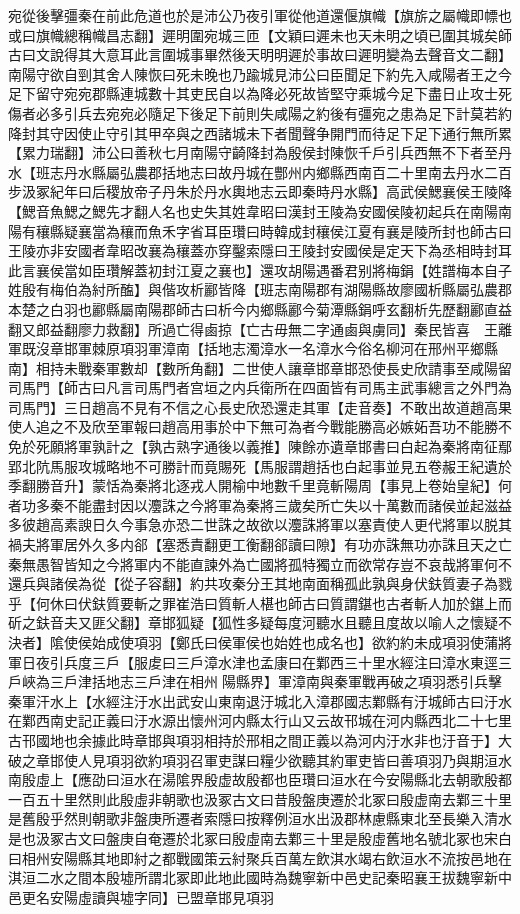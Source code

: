 宛從後擊彊秦在前此危道也於是沛公乃夜引軍從他道還偃旗幟【旗旂之屬幟即幖也或曰旗幟總稱幟昌志翻】遲明圍宛城三匝【文穎曰遲未也天未明之頃已圍其城矣師古曰文說得其大意耳此言圍城事畢然後天明明遲於事故曰遲明變為去聲音文二翻】南陽守欲自剄其舍人陳恢曰死未晚也乃踰城見沛公曰臣聞足下約先入咸陽者王之今足下留守宛宛郡縣連城數十其吏民自以為降必死故皆堅守乘城今足下盡日止攻士死傷者必多引兵去宛宛必隨足下後足下前則失咸陽之約後有彊宛之患為足下計莫若約降封其守因使止守引其甲卒與之西諸城未下者聞聲争開門而待足下足下通行無所累【累力瑞翻】沛公曰善秋七月南陽守齮降封為殷侯封陳恢千戶引兵西無不下者至丹水【班志丹水縣屬弘農郡括地志曰故丹城在酆州内鄉縣西南百二十里南去丹水二百步汲冢紀年曰后稷放帝子丹朱於丹水輿地志云即秦時丹水縣】高武侯鰓襄侯王陵降【鰓音魚鰓之鰓先才翻人名也史失其姓韋昭曰漢封王陵為安國侯陵初起兵在南陽南陽有穰縣疑襄當為穰而魚禾字省耳臣瓚曰時韓成封穰侯江夏有襄是陵所封也師古曰王陵亦非安國者韋昭改襄為穰蓋亦穿鑿索隱曰王陵封安國侯是定天下為丞相時封耳此言襄侯當如臣瓚解蓋初封江夏之襄也】還攻胡陽遇番君别將梅鋗【姓譜梅本自子姓殷有梅伯為紂所醢】與偕攻析酈皆降【班志南陽郡有湖陽縣故廖國析縣屬弘農郡本楚之白羽也酈縣屬南陽郡師古曰析今内鄉縣酈今菊潭縣鋗呼玄翻析先歷翻酈直益翻又郎益翻廖力救翻】所過亡得鹵掠【亡古毋無二字通鹵與虜同】秦民皆喜　王離軍既沒章邯軍棘原項羽軍漳南【括地志濁漳水一名漳水今俗名柳河在邢州平鄉縣南】相持未戰秦軍數却【數所角翻】二世使人讓章邯章邯恐使長史欣請事至咸陽留司馬門【師古曰凡言司馬門者宫垣之内兵衛所在四面皆有司馬主武事總言之外門為司馬門】三日趙高不見有不信之心長史欣恐還走其軍【走音奏】不敢出故道趙高果使人追之不及欣至軍報曰趙高用事於中下無可為者今戰能勝高必嫉妬吾功不能勝不免於死願將軍孰計之【孰古熟字通後以義推】陳餘亦遺章邯書曰白起為秦將南征鄢郢北阬馬服攻城略地不可勝計而竟賜死【馬服謂趙括也白起事並見五卷赧王紀遺於季翻勝音升】蒙恬為秦將北逐戎人開榆中地數千里竟斬陽周【事見上卷始皇紀】何者功多秦不能盡封因以灋誅之今將軍為秦將三歲矣所亡失以十萬數而諸侯並起滋益多彼趙高素諛日久今事急亦恐二世誅之故欲以灋誅將軍以塞責使人更代將軍以脱其禍夫將軍居外久多内郤【塞悉責翻更工衡翻郤讀曰隙】有功亦誅無功亦誅且天之亡秦無愚智皆知之今將軍内不能直諫外為亡國將孤特獨立而欲常存豈不哀哉將軍何不還兵與諸侯為從【從子容翻】約共攻秦分王其地南面稱孤此孰與身伏鈇質妻子為戮乎【何休曰伏鈇質要斬之罪崔浩曰質斬人椹也師古曰質謂鍖也古者斬人加於鍖上而斫之鈇音夫又匪父翻】章邯狐疑【狐性多疑每度河聽水且聽且度故以喻人之懷疑不決者】隂使侯始成使項羽【鄭氏曰侯軍侯也始姓也成名也】欲約約未成項羽使蒲將軍日夜引兵度三戶【服䖍曰三戶漳水津也孟康曰在鄴西三十里水經注曰漳水東逕三戶峽為三戶津括地志三戶津在相州陽縣界】軍漳南與秦軍戰再破之項羽悉引兵擊秦軍汗水上【水經注汙水出武安山東南退汙城北入漳郡國志鄴縣有汙城師古曰汙水在鄴西南史記正義曰汙水源出懷州河内縣太行山又云故邗城在河内縣西北二十七里古邗國地也余據此時章邯與項羽相持於邢相之間正義以為河内汙水非也汙音于】大破之章邯使人見項羽欲約項羽召軍吏謀曰糧少欲聽其約軍吏皆曰善項羽乃與期洹水南殷虛上【應劭曰洹水在湯隂界殷虚故殷都也臣瓚曰洹水在今安陽縣北去朝歌殷都一百五十里然則此殷虛非朝歌也汲冢古文曰昔殷盤庚遷於北冢曰殷虚南去鄴三十里是舊殷乎然則朝歌非盤庚所遷者索隱曰按釋例洹水出汲郡林慮縣東北至長樂入清水是也汲冢古文曰盤庚自奄遷於北冢曰殷虛南去鄴三十里是殷虛舊地名號北冢也宋白曰相州安陽縣其地即紂之都戰國策云紂聚兵百萬左飲淇水竭右飲洹水不流按邑地在淇洹二水之間本殷墟所謂北冢即此地此國時為魏寧新中邑史記秦昭襄王拔魏寧新中邑更名安陽虛讀與墟字同】已盟章邯見項羽